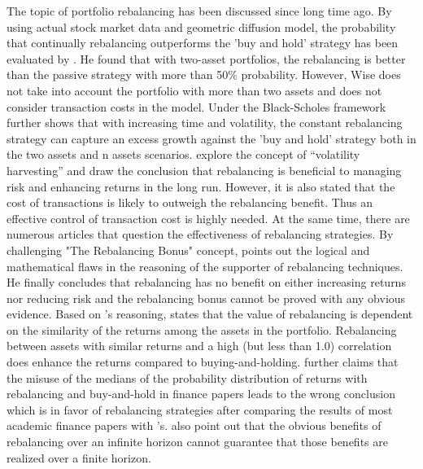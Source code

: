 \documentclass[
10pt, %
a4paper, %
oneside, %
headinclude,footinclude, %
BCOR5mm, %
]{scrartcl}
\begin{document}
The topic of portfolio rebalancing has been discussed since long time ago. By using actual stock market data and geometric diffusion model, the probability that continually rebalancing outperforms the 'buy and hold' strategy has been evaluated by \cite{wise1996}. He found that with two-asset portfolios, the rebalancing is better than the passive strategy with more than 50\% probability. However, Wise does not take into account the portfolio with more than two assets and does not consider transaction costs in the model. Under the Black-Scholes framework \cite{gabay2007} further shows that with increasing time and volatility, the constant rebalancing strategy can capture an excess growth against the 'buy and hold' strategy both in the two assets and n assets scenarios. \cite{bouchey2012} explore the concept of “volatility harvesting” and draw the conclusion that rebalancing is beneficial to managing risk and enhancing returns in the long run. However, it is also stated that the cost of transactions is likely to outweigh the rebalancing benefit. Thus an effective control of transaction cost is highly needed. At the same time, there are numerous articles that question the effectiveness of rebalancing strategies. By challenging "The Rebalancing Bonus" concept, \cite{Edesess2014} points out the logical and mathematical flaws in the reasoning of the supporter of rebalancing techniques. He finally concludes that rebalancing has no benefit on either increasing returns nor reducing risk and the rebalancing bonus cannot be proved with any obvious evidence. Based on \cite{Edesess2014}’s reasoning, \cite{Kitces2015} states that the value of rebalancing is dependent on the similarity of the returns among the assets in the portfolio. Rebalancing between assets with similar returns and a high (but less than 1.0) correlation does enhance the returns compared to buying-and-holding. \cite{Edesess2016} further claims that the misuse of the medians of the probability distribution of returns with rebalancing and buy-and-hold in finance papers leads to the wrong conclusion which is in favor of rebalancing strategies after comparing the results of most academic finance papers with \cite{wise1996}'s. \cite{cuthbertson2016} also point out that the obvious benefits of rebalancing over an infinite horizon cannot guarantee that those benefits are realized over a finite horizon.\\
\end{document}
